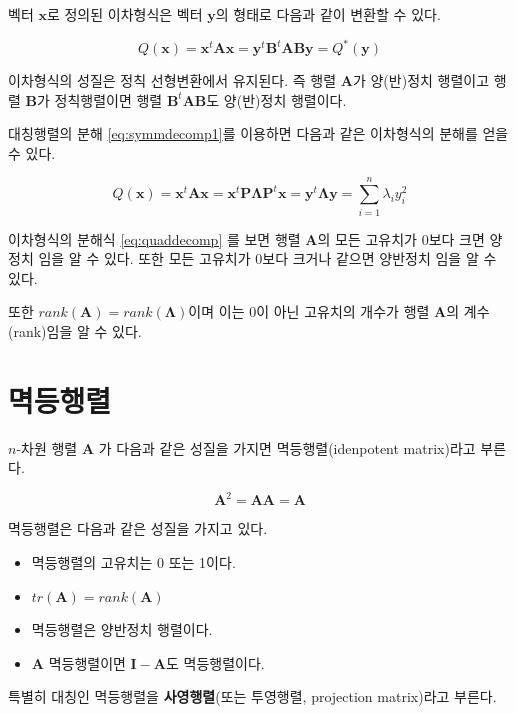 \documentclass[
]{book}
\providecommand{\tightlist}{%
  \setlength{\itemsep}{0pt}\setlength{\parskip}{0pt}}
\newcommand{\bm}[1]{\boldsymbol{\mathbf{#1}}}
\theoremstyle{definition}
\theoremstyle{definition}
\theoremstyle{definition}
\theoremstyle{definition}
\theoremstyle{remark}
\begin{document}
벡터 \(\bm x\)로 정의된 이차형식은 벡터 \(\bm y\)의 형태로 다음과 같이 변환할 수 있다.

\[ Q(\bm x) = \bm x^t \bm A \bm x = \bm y^t \bm B^t \bm A \bm B \bm y =Q^*(\bm y) \]

이차형식의 성질은 정칙 선형변환에서 유지된다. 즉 행렬 \(\bm A\)가 양(반)정치 행렬이고 행렬 \(\bm B\)가 정칙행렬이면 행렬 \(\bm B^t \bm A \bm B\)도 양(반)정치 행렬이다.

대칭행렬의 분해 \eqref{eq:symmdecomp1}를 이용하면 다음과 같은 이차형식의 분해를 얻을 수 있다.

\begin{equation}
Q(\bm x) = \bm x^t \bm A \bm x = \bm x^t \bm P \bm \Lambda \bm P^t \bm x = \bm y^t \bm \Lambda \bm y= \sum_{i=1}^n \lambda_i y_i^2 
\label{eq:quaddecomp}
\end{equation}

이차형식의 분해식 \eqref{eq:quaddecomp} 를 보면 행렬 \(\bm A\)의 모든 고유치가 0보다 크면 양정치 임을 알 수 있다. 또한 모든 고유치가 0보다 크거나 같으면 양반정치 임을 알 수 있다.

또한 \(rank(\bm A) = rank(\bm \Lambda)\)이며 이는 0이 아닌 고유치의 개수가 행렬 \(\bm A\)의 계수(rank)임을 알 수 있다.

\hypertarget{uxba71uxb4f1uxd589uxb82c}{%
\section{멱등행렬}\label{uxba71uxb4f1uxd589uxb82c}}

\(n\)-차원 행렬 \(\bm A\) 가 다음과 같은 성질을 가지면 멱등행렬(idenpotent matrix)라고 부른다.

\[ \bm A^2 = \bm A \bm A = \bm A \]

멱등행렬은 다음과 같은 성질을 가지고 있다.

\begin{itemize}
\tightlist
\item
  멱등행렬의 고유치는 0 또는 1이다.
\item
  \(tr(\bm A) =rank(\bm A)\)
\item
  멱등행렬은 양반정치 행렬이다.
\item
  \(\bm A\) 멱등행렬이면 \(\bm I - \bm A\)도 멱등행렬이다.
\end{itemize}

특별히 대칭인 멱등행렬을 \textbf{사영행렬}(또는 투영행렬, projection matrix)라고 부른다.

  
\end{document}
